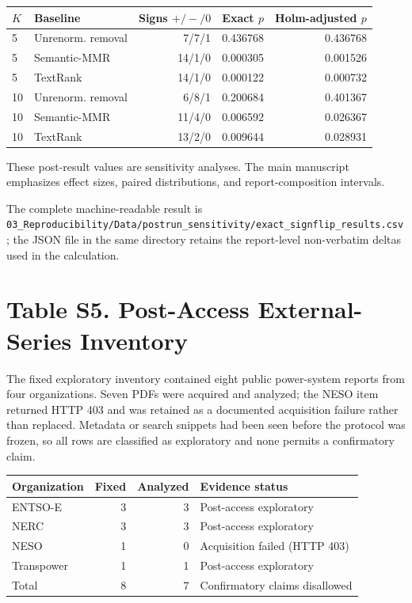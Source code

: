 \documentclass[11pt]{article}
\begin{document}
\begin{center}
\small
\begin{tabular}{llrrr}
\toprule
$K$ & Baseline & Signs $+/-/0$ & Exact $p$ & Holm-adjusted $p$\\
\midrule
5 & Unrenorm. removal & 7/7/1 & 0.436768 & 0.436768\\
5 & Semantic-MMR & 14/1/0 & 0.000305 & 0.001526\\
5 & TextRank & 14/1/0 & 0.000122 & 0.000732\\
10 & Unrenorm. removal & 6/8/1 & 0.200684 & 0.401367\\
10 & Semantic-MMR & 11/4/0 & 0.006592 & 0.026367\\
10 & TextRank & 13/2/0 & 0.009644 & 0.028931\\
\bottomrule
\end{tabular}
\end{center}

These post-result values are sensitivity analyses. The main manuscript emphasizes effect sizes, paired distributions, and report-composition intervals.

The complete machine-readable result is \nolinkurl{03_Reproducibility/Data/postrun_sensitivity/exact_signflip_results.csv}; the JSON file in the same directory retains the report-level non-verbatim deltas used in the calculation.

\section*{Table S5. Post-Access External-Series Inventory}

The fixed exploratory inventory contained eight public power-system reports from four organizations. Seven PDFs were acquired and analyzed; the NESO item returned HTTP 403 and was retained as a documented acquisition failure rather than replaced. Metadata or search snippets had been seen before the protocol was frozen, so all rows are classified as exploratory and none permits a confirmatory claim.

\begin{center}
\small
\begin{tabular}{lrrl}
\toprule
Organization & Fixed & Analyzed & Evidence status\\
\midrule
ENTSO-E & 3 & 3 & Post-access exploratory\\
NERC & 3 & 3 & Post-access exploratory\\
NESO & 1 & 0 & Acquisition failed (HTTP 403)\\
Transpower & 1 & 1 & Post-access exploratory\\
\midrule
Total & 8 & 7 & Confirmatory claims disallowed\\
\bottomrule
\end{tabular}
\end{center}
\end{document}

